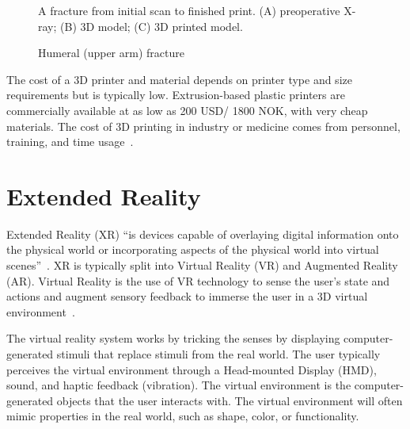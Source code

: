 \documentclass[a4paper]{report}
\begin{document}
\begin{figure}[h!]
    \centering
	\hfill
  \caption{Humeral (upper arm) fracture}
  \label{3dprint}
  \small
    A fracture from initial scan to finished print. (A) preoperative X-ray; (B) 3D model; (C) 3D printed model.
\end{figure}

The cost of a 3D printer and material depends on printer type and size requirements but is typically low. Extrusion-based plastic printers are commercially available at as low as 200 USD/ 1800 NOK, with very cheap materials. The cost of 3D printing in industry or medicine comes from personnel, training, and time usage~\cite{shahrubudin_overview_2019}.

\section{Extended Reality}


Extended Reality (XR) \enquote{is devices capable of overlaying digital information onto the physical world or incorporating aspects of the physical world into virtual scenes}~\cite{andrews_extended_2019}.
XR is typically split into Virtual Reality (VR) and Augmented Reality (AR).
Virtual Reality is the use of VR technology to sense the user's state and actions and augment sensory feedback to immerse the user in a 3D virtual environment~\cite{mihelj_virtual_2014}.

The virtual reality system works by tricking the senses by displaying computer-generated stimuli that replace stimuli from the real world. 
The user typically perceives the virtual environment through a Head-mounted Display (HMD), sound, and haptic feedback (vibration).
The virtual environment is the computer-generated objects that the user interacts with. The virtual environment will often mimic properties in the real world, such as shape, color, or functionality.
\end{document}
